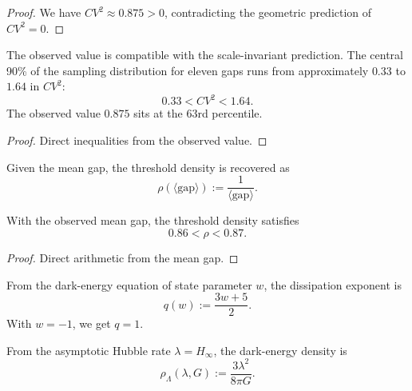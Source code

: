 \begin{proof}
We have $CV^2 \approx 0.875 > 0$, contradicting the geometric prediction of $CV^2 = 0$.
\end{proof}

\begin{theorem}
The observed value is compatible with the scale-invariant prediction. The central 90\% of the sampling distribution for eleven gaps runs from approximately $0.33$ to $1.64$ in $CV^2$:
\begin{equation}
0.33 < CV^2 < 1.64 .
\end{equation}
The observed value $0.875$ sits at the 63rd percentile.
\end{theorem}

\begin{proof}
Direct inequalities from the observed value.
\end{proof}

\begin{definition}
Given the mean gap, the threshold density is recovered as
\begin{equation}
\rho(\langle \text{gap} \rangle) := \frac{1}{\langle \text{gap} \rangle} .
\end{equation}
\end{definition}

\begin{theorem}
With the observed mean gap, the threshold density satisfies
\begin{equation}
0.86 < \rho < 0.87 .
\end{equation}
\end{theorem}

\begin{proof}
Direct arithmetic from the mean gap.
\end{proof}

\begin{definition}
From the dark-energy equation of state parameter $w$, the dissipation exponent is
\begin{equation}
q(w) := \frac{3w + 5}{2} .
\end{equation}
With $w = -1$, we get $q = 1$.
\end{definition}

\begin{definition}
From the asymptotic Hubble rate $\lambda = H_\infty$, the dark-energy density is
\begin{equation}
\rho_\Lambda(\lambda, G) := \frac{3\lambda^2}{8\pi G} .
\end{equation}
\end{definition}


